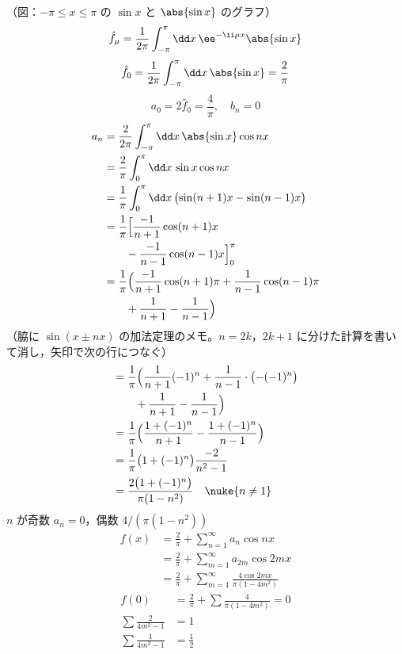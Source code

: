 （図：$-\pi\le x\le\pi$ の $\sin x$ と $\abs{\sin x}$ のグラフ）
\[ \hat{f}_{\mu}=\frac{1}{2\pi}\int_{-\pi}^{\pi}\dd x\,\ee^{-\ii\mu x}\abs{\sin x} \]
\[ \hat{f}_0=\frac{1}{2\pi}\int_{-\pi}^{\pi}\dd x\,\abs{\sin x}=\frac{2}{\pi} \]
\[ a_0=2\hat{f}_0=\frac{4}{\pi},\quad b_n=0 \]
\begin{align*}
  a_n&=\frac{2}{2\pi}\int_{-\pi}^{\pi}\dd x\,\abs{\sin x}\cos nx\\
  &=\frac{2}{\pi}\int_{0}^{\pi}\dd x\,\sin x\cos nx\\
  &=\frac{1}{\pi}\int_{0}^{\pi}\dd x\,\bigl(\sin(n+1)x-\sin(n-1)x\bigr)\\
  &=\frac{1}{\pi}\Bigl[\frac{-1}{n+1}\cos(n+1)x\\
  &\qquad-\frac{-1}{n-1}\cos(n-1)x\Bigr]_{0}^{\pi}\\
  &=\frac{1}{\pi}\Bigl(\frac{-1}{n+1}\cos(n+1)\pi+\frac{1}{n-1}\cos(n-1)\pi\\
  &\qquad+\frac{1}{n+1}-\frac{1}{n-1}\Bigr)
\end{align*}
（脇に $\sin(x\pm nx)$ の加法定理のメモ。$n=2k$，$2k+1$ に分けた計算を書いて消し，矢印で次の行につなぐ）
\begin{align*}
  &=\frac{1}{\pi}\Bigl(\frac{1}{n+1}(-1)^{n}+\frac{1}{n-1}\cdot\bigl(-(-1)^{n}\bigr)\\
  &\qquad+\frac{1}{n+1}-\frac{1}{n-1}\Bigr)\\
  &=\frac{1}{\pi}\Bigl(\frac{1+(-1)^{n}}{n+1}-\frac{1+(-1)^{n}}{n-1}\Bigr)\\
  &=\frac{1}{\pi}\bigl(1+(-1)^{n}\bigr)\frac{-2}{n^{2}-1}\\
  &=\frac{2\bigl(1+(-1)^{n}\bigr)}{\pi(1-n^{2})}\quad\nuke{n\neq1}
\end{align*}
$n$ が奇数 $a_n=0$，偶数 $4/(\pi(1-n^{2}))$
\begin{align*}
  f(x)&=\frac{2}{\pi}+\sum_{n=1}^{\infty}a_n\cos nx\\
  &=\frac{2}{\pi}+\sum_{m=1}^{\infty}a_{2m}\cos2mx\\
  &=\frac{2}{\pi}+\sum_{m=1}^{\infty}\frac{4\cos2mx}{\pi(1-4m^{2})}
\end{align*}
\begin{align*}
  f(0)&=\frac{2}{\pi}+\sum\frac{4}{\pi(1-4m^{2})}=0\\
  \sum\frac{2}{4m^{2}-1}&=1\\
  \sum\frac{1}{4m^{2}-1}&=\frac{1}{2}
\end{align*}
